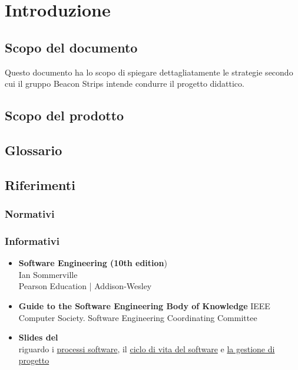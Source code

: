 \section{Introduzione}
	\subsection{Scopo del documento} 
	Questo documento ha lo scopo di spiegare dettagliatamente le strategie secondo cui il gruppo Beacon Strips intende condurre il progetto didattico.
	\subsection{Scopo del prodotto}
	\SCOPO
	\subsection{Glossario}
	\GLOSSARIO
	\subsection{Riferimenti}
		\subsubsection{Normativi}
			\NORMATIVI		
			
		\subsubsection{Informativi}
			\begin{itemize}
				\item \textbf{Software Engineering (10th edition}) \\
				Ian Sommerville \\
				Pearson Education | Addison-Wesley
				\item \textbf{Guide to the Software Engineering Body of Knowledge}
				IEEE Computer Society. Software Engineering Coordinating Committee
				\item \textbf{Slides del \COMMITTENTE} \\ riguardo i  \href{http://www.math.unipd.it/~tullio/IS-1/2015/Dispense/L02.pdf}{processi software}, il \href{http://www.math.unipd.it/~tullio/IS-1/2015/Dispense/L03.pdf}{ciclo di vita del software} e \href{http://www.math.unipd.it/~tullio/IS-1/2015/Dispense/L04.pdf}{la gestione di progetto}	
			\end{itemize}
